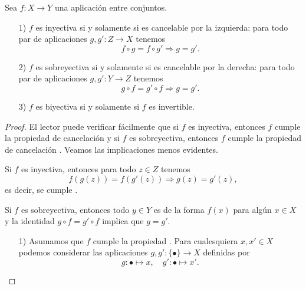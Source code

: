 \begin{proposicion}
  \label{prop:mono-epi-iso-en-Set}
  Sea $f\colon X\to Y$ una aplicación entre conjuntos.

  \begin{enumerate}
  \item[1)] $f$ es inyectiva si y solamente si es cancelable por la izquierda:
    para todo par de aplicaciones $g, g'\colon Z\to X$ tenemos
    \begin{equation}
      \label{eqn:cancelacion-de-mono}
      f\circ g = f\circ g' \Longrightarrow g = g'.
    \end{equation}

  \item[2)] $f$ es sobreyectiva si y solamente si es cancelable por la derecha:
    para todo par de aplicaciones $g, g'\colon Y\to Z$ tenemos
    \begin{equation}
      \label{eqn:cancelacion-de-epi}
      g\circ f = g'\circ f \Longrightarrow g = g'.
    \end{equation}

  \item[3)] $f$ es biyectiva si y solamente si $f$ es invertible.
  \end{enumerate}

  \begin{proof}
    El lector puede verificar fácilmente que si $f$ es inyectiva, entonces $f$
    cumple la propiedad de cancelación  y si $f$
    es sobreyectiva, entonces $f$ cumple la propiedad de cancelación
    . Veamos las implicaciones menos evidentes.

    \ifwordy
    \begin{shaded}
      Si $f$ es inyectiva, entonces para todo $z\in Z$ tenemos
      $$f (g (z)) = f (g' (z)) \Longrightarrow g (z) = g' (z),$$
      es decir, se cumple .

      Si $f$ es sobreyectiva, entonces todo $y\in Y$ es de la forma $f (x)$ para
      algún $x\in X$ y la identidad $g\circ f = g'\circ f$ implica que $g = g'$.
    \end{shaded}
    \fi

    \begin{enumerate}
    \item[1)] Asumamos que $f$ cumple la propiedad
      . Para cualesquiera $x,x'\in X$ podemos
      considerar las aplicaciones $g,g'\colon \{ \bullet \} \to X$ definidas por
      $$g\colon \bullet \mapsto x, \quad g'\colon \bullet \mapsto x'.$$


\end{enumerate}
\end{proof}
\end{proposicion}
